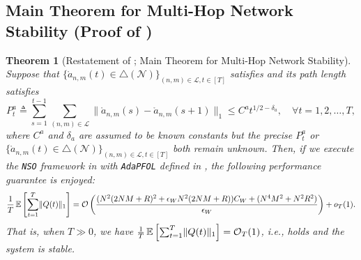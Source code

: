 \documentclass[11pt,fullpage,letterpaper]{article} %
\newtheorem{theorem}{Theorem}[section]
\renewcommand{\bm}[1]{#1}%
\renewcommand{\O}{\operatorname{\mathcal O}}
\newcommand{\E}{\operatornamewithlimits{\mathbb{E}}}
\newcommand{\mN}{{\mathcal N}}
\newcommand{\mL}{{\mathcal L}}
\newcommand{\SSAlg}{\texttt{NSO}\xspace}
\newcommand{\OLOAlg}{\texttt{AdaPFOL}\xspace}
\begin{document}
\subsection{Main Theorem for Multi-Hop Network Stability (Proof of )}\label{sec:multi-hop stability appendix}
\begin{theorem}[Restatement of ; Main Theorem for Multi-Hop Network Stability]
Suppose that $\{\mathring{\bm a}_{n,m}(t)\in \triangle(\mN)\}_{(n,m)\in \mL,t\in [T]}$ satisfies  and its path length satisfies
\begin{equation*}
P_t^a\triangleq \sum_{s=1}^{t-1} \sum_{(n,m)\in \mL} \lVert \mathring{\bm a}_{n,m}(s) - \mathring{\bm a}_{n,m}(s+1)\rVert_1\le C^a t^{1/2 - \delta_a},\quad \forall t=1,2,\ldots,T,
\end{equation*}
where $C^a$ and $\delta_a$ are assumed to be known constants but the precise $P_t^a$ or $\{\mathring{\bm a}_{n,m}(t)\in \triangle(\mN)\}_{(n,m)\in \mL,t\in [T]}$ both remain unknown.
Then, if we execute the \SSAlg framework in  with \OLOAlg defined in , the following performance guarantee is enjoyed:
\begin{equation*}
\frac 1T\E\left [\sum_{t=1}^T \lVert \bm Q(t)\rVert_1\right ]=\O\left (\frac{(N^2(2NM+R)^2 + \epsilon_W N^2 (2NM+R))C_W + (N^4 M^2 + N^2 R^2)}{\epsilon_W}\right )+o_T(1).
\end{equation*}
That is, when $T\gg 0$, we have $\frac{1}{T} \E\left [\sum_{t=1}^T \lVert \bm Q(t)\rVert_1\right ]=\O_T(1)$, \textit{i.e.},  holds and the system is stable.
\end{theorem}
\end{document}
